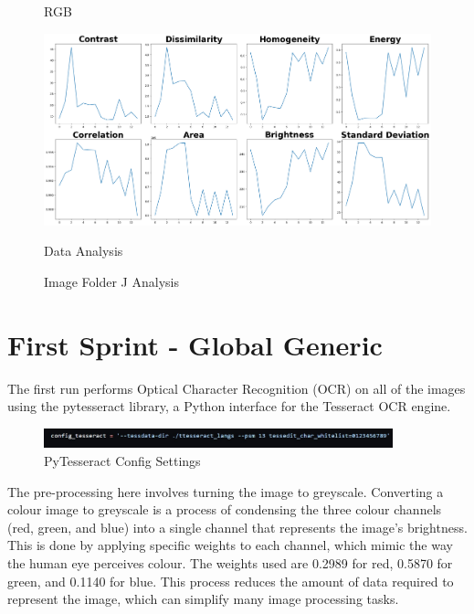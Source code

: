 \begin{figure}[ht]
\begin{minipage}[t]{0.25\textwidth}
        \caption*{RGB}
    \end{minipage}\hfill
    \begin{minipage}[t]{0.50\textwidth}
        \centering
        \includegraphics[width=\textwidth]{Figures/EDA_Charts/11/da.png}
        \caption*{Data Analysis}
    \end{minipage}
    \caption{Image Folder J Analysis}
    \label{fig:Image Folder J Analysis}
\end{figure}


\newpage

\section{First Sprint - Global Generic}

The first run performs Optical Character Recognition (OCR) on all of the images using the pytesseract library, a Python interface for the Tesseract OCR engine.

\begin{figure}[ht]
    \centering
    \includegraphics[width=0.9\textwidth]{Figures/firstrun/tesseract_config.jpg}
    \caption[PyTesseract Config Settings]{PyTesseract Config Settings}
    \label{fig:PyTesseract Config Settings}
\end{figure}


The pre-processing here involves turning the image to greyscale. Converting a colour image to greyscale is a process of condensing the three colour channels (red, green, and blue) into a single channel that represents the image's brightness. This is done by applying specific weights to each channel, which mimic the way the human eye perceives colour. The weights used are 0.2989 for red, 0.5870 for green, and 0.1140 for blue. This process reduces the amount of data required to represent the image, which can simplify many image processing tasks. \cite{cadikPerceptualEvaluationColortoGrayscale2008}

